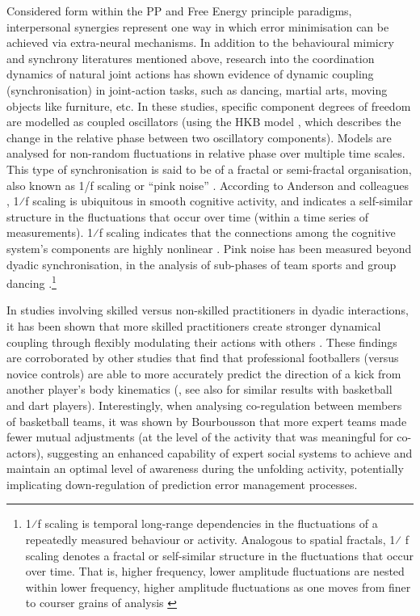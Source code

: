 \begin{CJK}{UTF8}{gbsn}
{Considered form within the PP and Free Energy principle paradigms, interpersonal synergies represent one way in which error minimisation can be achieved via extra-neural mechanisms.  In addition to the behavioural mimicry and synchrony literatures mentioned above, research into the coordination dynamics of natural joint actions  has shown evidence of dynamic coupling (synchronisation) in joint-action tasks, such as dancing, martial arts, moving objects like furniture, etc. In these studies, specific component degrees of freedom are modelled as coupled oscillators (using the HKB model \citep{Haken1985,Kelso1986}, which describes the change in the relative phase between two oscillatory components). Models are analysed for non-random fluctuations in relative phase over multiple time scales.  This type of synchronisation is said to be of a fractal or semi-fractal organisation, also known as 1/f scaling or ``pink noise'' \citep{Caron2017}. According to Anderson and colleagues \citep{Anderson2012}, 1⁄f scaling is ubiquitous in smooth cognitive activity, and indicates a self-similar structure in the fluctuations that occur over time (within a time series of measurements).
1⁄f scaling indicates that the connections among the cognitive system's components are highly nonlinear \citep{Ding2002,Holden2013,Kello2010,Riley2011,VanOrden2003,VanOrden2005}. Pink noise has been measured beyond dyadic synchronisation, in the analysis of sub-phases of team sports \citep{Passos2014,Duarte2012} and group dancing \citep{Chauvigne2017}.\footnote{1⁄f scaling is temporal long-range dependencies in the fluctuations of a repeatedly measured behaviour or activity. Analogous to spatial fractals, 1⁄ f scaling denotes a fractal or self-similar structure in the fluctuations that occur over time. That is, higher frequency, lower amplitude fluctuations are nested within lower frequency, higher amplitude fluctuations as one moves from finer to courser grains of analysis \cites(for a more detailed description see, for example)(){Holden2005}{Kello2009}}

In studies involving skilled versus non-skilled practitioners in dyadic interactions, it has been shown that more skilled practitioners create stronger dynamical coupling through flexibly modulating their actions with others \citep{Schmidt2011, Caron2017}. These findings are corroborated by other studies that find that professional footballers (versus novice controls) are able to more accurately predict the direction of a kick from another player's body kinematics (\cite{Tomeo2012}, see also \cite{Aglioti2008,Mulligan2016} for similar results with basketball and dart players). Interestingly, when analysing co-regulation between members of basketball teams, it was shown by Bourbousson \textcite{Bourbousson2015} that more expert teams made fewer mutual adjustments (at the level of the activity that was meaningful for co-actors), suggesting an enhanced capability of expert social systems to achieve and maintain an optimal level of awareness during the unfolding activity, potentially implicating down-regulation of prediction error management processes.

}
\end{CJK}
